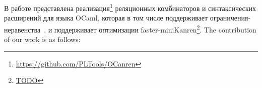 
В работе представлена реализация\footnote{\url{https://github.com/PLTools/OCanren}} реляционных комбинаторов и синтаксических расширений для языка OCaml,
которая в том числе поддерживает ограничения-неравенства~\cite{CKanren}, и поддерживает оптимизации faster-miniKanren\footnote{\url{TODO}}.
The contribution of our work is as follows:

